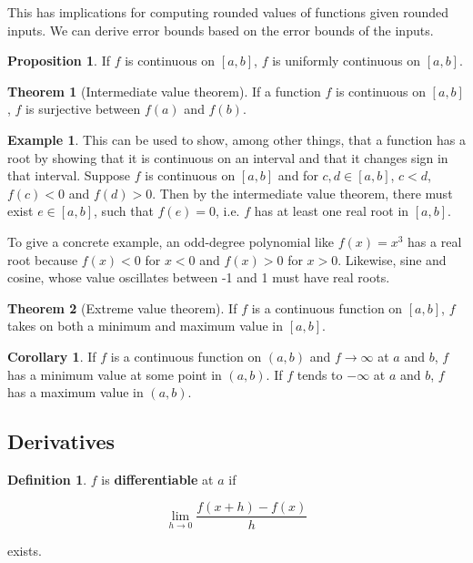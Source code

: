 \documentclass{article}
\theoremstyle{definition}
\newtheorem{definition}{Definition}[section]
\newtheorem{example}{Example}[section]
\newtheorem{proposition}{Proposition}[section]
\newtheorem{theorem}{Theorem}[section]
\newtheorem{corollary}{Corollary}[section]
\begin{document}
This has implications for computing rounded values of functions given rounded inputs. We can derive error bounds based on the error bounds of the inputs.

\begin{proposition}
If $f$  is continuous on $[a, b]$, $f$ is uniformly continuous on $[a, b]$.
\end{proposition}

\begin{theorem}[Intermediate value theorem]
If a function $f$ is continuous on $[a, b]$, $f$ is surjective between $f(a)$ and $f(b)$.
\end{theorem}

\begin{example}
This can be used to show, among other things, that a function has a root by showing that it is continuous on an interval and that it changes sign in that interval. Suppose $f$ is continuous on $[a, b]$ and for $c, d \in [a,b]$, $c < d$, $f(c) < 0$ and $f(d) > 0$. Then by the intermediate value theorem, there must exist $e \in [a,b]$, such that $f(e) = 0$, i.e. $f$ has at least one real root in $[a, b]$.

To give a concrete example, an odd-degree polynomial like $f(x) = x^3$ has a real root because $f(x) < 0$ for $x < 0$ and $f(x) > 0$ for $x > 0$. Likewise, sine and cosine, whose value oscillates between -1 and 1 must have real roots.
\end{example}

\begin{theorem}[Extreme value theorem]
If $f$ is a continuous function on $[a,b]$, $f$ takes on both a minimum and maximum value in $[a, b]$.
\end{theorem}

\begin{corollary}
If $f$ is a continuous function on $(a, b)$ and $f \to \infty$ at $a$ and $b$, $f$ has a minimum value at some point in $(a, b)$. If $f$ tends to $-\infty$ at $a$ and $b$, $f$ has a maximum value in $(a, b)$.
\end{corollary}

\subsection{Derivatives}

\begin{definition} 
$f$ is \textbf{differentiable} at $a$ if

\begin{equation}
\lim_{h \to 0} \frac{f(x+h) - f(x)}{h}
\end{equation}

exists.
\end{definition}
\end{document}

